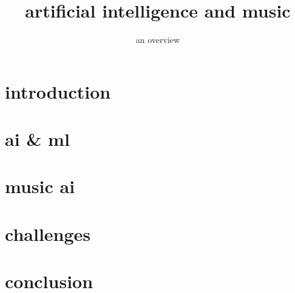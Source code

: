 

\title{artificial intelligence and music}
\subtitle{an overview} 


	

    \section[intro]{introduction}
        

    \section{ai \& ml}
        
        
    \section{music ai}
        
    
    \section[challenges]{challenges}
        
        
    \section{conclusion}
        



